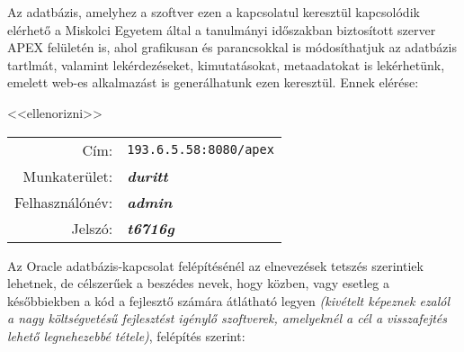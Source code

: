 \par

Az adatbázis, amelyhez a szoftver ezen a kapcsolatul keresztül kapcsolódik elérhető a Miskolci Egyetem által a tanulmányi időszakban biztosított szerver APEX felületén is, ahol grafikusan és parancsokkal is módosíthatjuk az adatbázis tartlmát, valamint lekérdezéseket, kimutatásokat, metaadatokat is lekérhetünk, emelett web-es alkalmazást is generálhatunk ezen keresztül. Ennek elérése:

<<ellenorizni>>

\begin{center}
\begin{tabular}{rl}
Cím: & \texttt{193.6.5.58:8080/apex}\\
Munkaterület: & \textit{\textbf{duritt}}\\
Felhasználónév: & \textit{\textbf{admin}}\\
Jelszó: & \textit{\textbf{t6716g}}\\

\end{tabular}
\end{center}

Az Oracle adatbázis-kapcsolat felépítésénél az elnevezések tetszés szerintiek lehetnek, de célszerűek a beszédes nevek, hogy közben, vagy esetleg a későbbiekben a kód a fejlesztő számára átlátható legyen \textit{(kivételt képeznek ezalól a nagy költségvetésű fejlesztést igénylő szoftverek, amelyeknél a cél a visszafejtés lehető legnehezebbé tétele)}, felépítés szerint:

